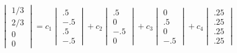 \documentclass{article}
\begin{document}
\[
\begin{vmatrix}1/3 \\2/3 \\ 0\\0\end{vmatrix} = 
    c_1\begin{vmatrix} .5 \\ -.5 \\ .5 \\ -.5 \end{vmatrix} +
    c_2\begin{vmatrix}.5 \\0 \\ -.5\\0\end{vmatrix} +
    c_3\begin{vmatrix}0 \\.5 \\ 0\\-.5\end{vmatrix} +
    c_4\begin{vmatrix} .25\\.25\\.25\\.25\end{vmatrix}
\]
\end{document}
